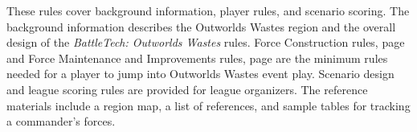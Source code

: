 These rules cover background information, player rules, and scenario scoring.
The background information describes the Outworlds Wastes region and the overall design of the \emph{BattleTech: Outworlds Wastes} rules.
Force Construction rules, page \pageref{subsec:force_construction} and Force Maintenance and Improvements rules, page \pageref{subsec:force_maintenance} are the minimum rules needed for a player to jump into Outworlds Wastes event play.
Scenario design and league scoring rules are provided for league organizers.
The reference materials include a region map, a list of references, and sample tables for tracking a commander's forces.
